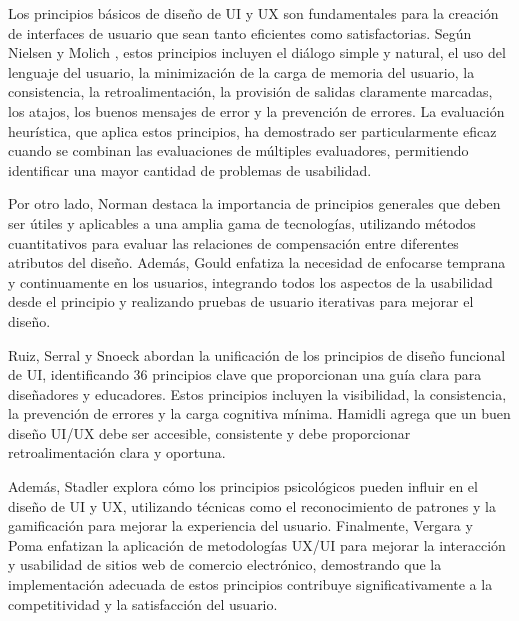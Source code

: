 Los principios básicos de diseño de UI y UX son fundamentales para la creación de interfaces de usuario que sean tanto eficientes como satisfactorias. Según Nielsen y Molich \citeyear{nielsen_heuristic_1990}, estos principios incluyen el diálogo simple y natural, el uso del lenguaje del usuario, la minimización de la carga de memoria del usuario, la consistencia, la retroalimentación, la provisión de salidas claramente marcadas, los atajos, los buenos mensajes de error y la prevención de errores. La evaluación heurística, que aplica estos principios, ha demostrado ser particularmente eficaz cuando se combinan las evaluaciones de múltiples evaluadores, permitiendo identificar una mayor cantidad de problemas de usabilidad.

Por otro lado, Norman \citeyear{norman_design_1983} destaca la importancia de principios generales que deben ser útiles y aplicables a una amplia gama de tecnologías, utilizando métodos cuantitativos para evaluar las relaciones de compensación entre diferentes atributos del diseño. Además, Gould \citeyear{gould_how_1988} enfatiza la necesidad de enfocarse temprana y continuamente en los usuarios, integrando todos los aspectos de la usabilidad desde el principio y realizando pruebas de usuario iterativas para mejorar el diseño.

Ruiz, Serral y Snoeck \citeyear{ruiz_unifying_2021} abordan la unificación de los principios de diseño funcional de UI, identificando 36 principios clave que proporcionan una guía clara para diseñadores y educadores. Estos principios incluyen la visibilidad, la consistencia, la prevención de errores y la carga cognitiva mínima. Hamidli \citeyear{hamidli_introduction_2023} agrega que un buen diseño UI/UX debe ser accesible, consistente y debe proporcionar retroalimentación clara y oportuna.

Además, Stadler \citeyear{stadler_how_2022} explora cómo los principios psicológicos pueden influir en el diseño de UI y UX, utilizando técnicas como el reconocimiento de patrones y la gamificación para mejorar la experiencia del usuario. Finalmente, Vergara y Poma \citeyear{heidy_elizabeth_vergara_zurita_ux_2023} enfatizan la aplicación de metodologías UX/UI para mejorar la interacción y usabilidad de sitios web de comercio electrónico, demostrando que la implementación adecuada de estos principios contribuye significativamente a la competitividad y la satisfacción del usuario.

